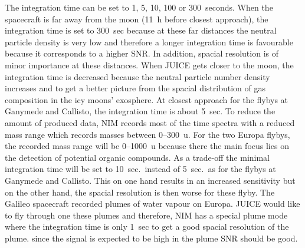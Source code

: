 	The integration time can be set to 1, 5, 10, 100 or 300~seconds. When the spacecraft is far away from the moon (11~h before closest approach), the integration time is set to 300~sec because at these far distances the neutral particle density is very low and therefore a longer integration time is favourable because it corresponds to a higher SNR. In addition, spacial resolution is of minor importance at these distances. When JUICE gets closer to the moon, the integration time is decreased because the neutral particle number density increases and to get a better picture from the spacial distribution of gas composition in the icy moons' exosphere. At closest approach for the flybys at Ganymede and Callisto, the integration time is about 5~sec. To reduce the amount of produced data, NIM records most of the time spectra with a reduced mass range which records masses between 0--300~u. For the two Europa flybys, the recorded mass range will be 0--1000~u because there the main focus lies on the detection of potential organic compounds. As a trade-off the minimal integration time will be set to 10~sec.\ instead of 5~sec.\ as for the flybys at Ganymede and Callisto. This on one hand results in an increased sensitivity but on the other hand, the spacial resolution is then worse for these flyby. The Galileo spacecraft recorded plumes of water vapour on Europa. JUICE would like to fly through one these plumes and therefore, NIM has a special plume mode where the integration time is only 1~sec to get a good spacial resolution of the plume. since the signal is expected to be high in the plume SNR should be good.
	
	
